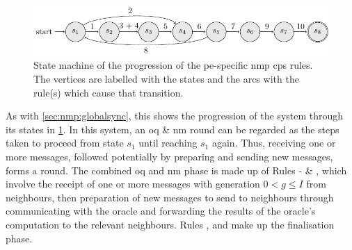 \begin{figure}
    \centering
    \includegraphics[width=1.0\textwidth]{chapters/nmp/images/proxelspecificstatemachine.pdf}
    \caption[State machine of the progression of the -specific  \gls{cps} rules]{State machine of the progression of the \gls{pe}-specific \gls{nmp} \gls{cps} rules.  The vertices are labelled with the states and the arcs with the rule(s) which cause that transition.}
    \label{fig:nmp:proxelspecificstatemachine}
\end{figure}

As with \cref{sec:nmp:globalsync}, this  shows the progression of the system through its states in \cref{fig:nmp:proxelspecificstatemachine}.  In this system, an \gls{oq} \& \gls{nm} round can be regarded as the steps taken to proceed from state \(s_1\) until reaching \(s_1\) again.  Thus, receiving one or more messages, followed potentially by preparing and sending new messages, forms a round.  The combined \gls{oq} and \gls{nm} phase is made up of Rules - \& , which involve the receipt of one or more messages with generation \(0 < g \leq I\) from neighbours, then preparation of new messages to send to neighbours through communicating with the oracle and forwarding the results of the oracle's computation to the relevant neighbours.  Rules ,  and  make up the finalisation phase.

